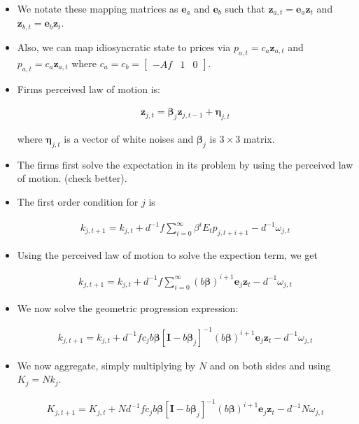 \documentclass[11pt]{article}
\numberwithin{equation}{section}
\begin{document}
\begin{itemize}
		\item We notate these mapping matrices as $\mathbf{e}_a$ and $\mathbf{e}_b$ such that $\mathbf{z}_{a,t} = \mathbf{e}_a \mathbf{z}_t$ and $\mathbf{z}_{b,t} = \mathbf{e}_b \mathbf{z}_t$.
		
		\item Also, we can map idiosyncratic state to prices via $p_{a,t} = c_a \mathbf{z}_{a,t}$ and  $p_{a,t} = c_a \mathbf{z}_{a,t}$  where $c_a = c_b = [{\begin{array}{ccc} -Af & 1 &  0 \end{array}}]$.
		
		\item Firms perceived law of motion is: 
		
		\begin{align*}
		\mathbf{z}_{j,t} = \mathbf{\beta}_j \mathbf{z}_{j,t-1} + \mathbf{\eta}_{j,t}
		\end{align*}
		
		where $\mathbf{\eta}_{j,t}$ is a vector of white noises and $\mathbf{\beta}_j$ is $3\times3$ matrix. 
		
		\item The firms first solve the expectation in its problem by using the perceived law of motion. {\color{red}(check better)}. 
		
		\item The first order condition for $j$ is 
		
		\begin{align*}
		k_{j,t+1}=k_{j,t}+d^{-1} f \sum_{i=0}^\infty \beta^i E_t p_{j,t+i+1} -d^{-1} \omega_{j,t}
		\end{align*}
		
		\item Using the perceived law of motion to solve the expection term, we get 
		
		\begin{align*}
		k_{j,t+1}=k_{j,t}+d^{-1} f \sum_{i=0}^\infty (b\mathbf{\beta})^{i+1} \mathbf{e}_j \mathbf{z}_t -d^{-1} \omega_{j,t}
		\end{align*}
		
		\item We now solve the geometric progression expression:
		
		\begin{align*}
		k_{j,t+1}=k_{j,t}+d^{-1} f c_j b \mathbf{\beta} \left[\mathbf{I} - b \mathbf{\beta}_j \right]^{-1} (b\mathbf{\beta})^{i+1} \mathbf{e}_j \mathbf{z}_t -d^{-1} \omega_{j,t}
		\end{align*}
		
		\item We now aggregate, simply multiplying by $N$ and on both sides and using $K_j=Nk_j$.
		
		\begin{align*}
		K_{j,t+1}=K_{j,t}+Nd^{-1} f c_j b \mathbf{\beta} \left[\mathbf{I} - b \mathbf{\beta}_j \right]^{-1} (b\mathbf{\beta})^{i+1} \mathbf{e}_j \mathbf{z}_t -d^{-1} N \omega_{j,t}
		\end{align*} 
		
		
		
			
	
	\end{itemize}

	
\end{document}
